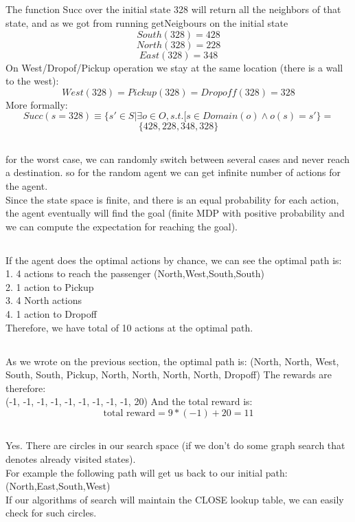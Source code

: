 \documentclass[12pt]{article}
\begin{document}
\subsection{}
The function Succ over the initial state 328 will return all the neighbors of that state, and as we got from running getNeigbours on the initial state\\
$$South(328)=428$$
$$North(328)=228$$
$$East(328)=348$$
On West/Dropof/Pickup operation we stay at the same location (there is a wall to the west):
$$West(328)=Pickup(328)=Dropoff(328)=328$$
More formally:
$$Succ(s=328)\equiv\{s'\in S | \exists o\in O, s.t. [s \in Domain(o)\wedge o(s)=s'\} = $$
$$\{428,228,348,328\}$$
\subsection{}
for the worst case, we can randomly switch between several cases and never reach a destination. so for the random agent we can get infinite number of actions for the agent.\\
Since the state space is finite, and there is an equal probability for each action, the agent eventually will find the goal (finite MDP with positive probability and we can compute the expectation for reaching the goal).
\subsection{}
If the agent does the optimal actions by chance, we can see the optimal path is:\\
1. 4 actions to reach the passenger (North,West,South,South)\\
2. 1 action to Pickup\\
3. 4 North actions\\
4. 1 action to Dropoff\\
Therefore, we have total of 10 actions at the optimal path.
\subsection{}
As we wrote on the previous section, the optimal path is:
(North, North, West, South, South, Pickup, North, North, North, North, Dropoff)
The rewards are therefore:\\
(-1, -1, -1, -1, -1, -1, -1, -1, -1, 20)
And the total reward is:
$$\text{total reward} = 9*(-1) + 20 = 11$$

\subsection{}
Yes. There are circles in our search space (if we don't do some graph search that denotes already visited states).\\
For example the following path will get us back to our initial path:\\
(North,East,South,West)\\
If our algorithms of search will maintain the CLOSE lookup table, we can easily check for such circles.
\end{document}
